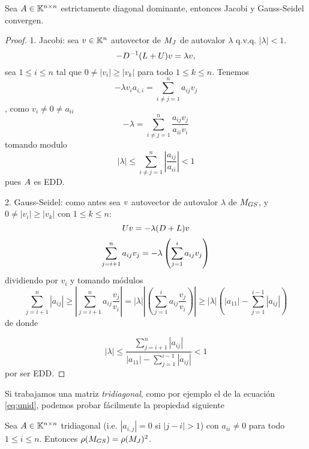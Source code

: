 \tcc
\begin{prop}
Sea $\Ab\in \Knn$ estrictamente diagonal dominante, entonces Jacobi y Gauss-Seidel convergen.
\end{prop}
\etcc
\begin{proof}
1. Jacobi: sea $\vb\in \Kn$ autovector de $\Mb_J$ de autovalor $\lambda$ q.v.q. $|\lambda|<1$.
$$
-D^{-1}(L+U)\vb=\lambda\vb,
$$
sea $1\le i\le n$ tal que
$0\neq |v_i|\ge |v_k|$ para todo $1\le k\le n$. Tenemos
$$
-\lambda v_ia_{i,i}=\sum_{i\neq j=1}^n a_{ij}v_j
$$, como $v_i\neq 0\neq a_{ii}$
$$
-\lambda=\sum_{i\neq j=1}^n \frac{a_{ij}v_j}{a_{ii}v_i}
$$
tomando modulo
$$
|\lambda|\le \sum_{i\neq j=1}^n |\frac{a_{ij}}{a_{ii}}|<1
$$
pues $\Ab$ es EDD.

2. Gauss-Seidel: como antes sea $\vb$ autovector de autovalor $\lambda$ de $\Mb_{GS}$, y $0\neq|v_i|\ge |v_k|$ con $1\le k\le n$:
$$
\Ub\vb=-\lambda(\Db+\Lb)\vb
$$
$$
\sum_{j=i+1}^na_{ij}\vb_j=-\lambda\left(
\sum_{j=1}^{i}a_{ij}\vb_j\right)
$$
dividiendo por $v_i$ y tomando módulos
$$
\sum_{j=i+1}^n|a_{ij}|
\ge \left|\sum_{j=i+1}^na_{ij}\frac{v_j}{v_i}\right|=|\lambda|\left|\left(
\sum_{j=1}^{i}a_{ij}\frac{v_j}{v_i}\right)\right|\ge |\lambda| \left(|a_{11}|-
\sum_{j=1}^{i-1}|a_{ij}|\right)
$$
de donde

$$
|\lambda|\le
\frac{\sum_{j=i+1}^n|a_{ij}|}{|a_{11}|-
\sum_{j=1}^{i-1}|a_{ij}|}
<1
$$
por ser EDD.
\end{proof}
Si trabajamos una matriz \emph{tridiagonal}, como por ejemplo el de la ecuación \eqref{eq:unid},  podemos probar fácilmente la propiedad siguiente
 \begin{prop}
\label{prop:mat_trid_gs_j}
Sea $\Ab\in \Knn$ tridiagonal (i.e. $|a_{i,j}|=0$ si $|j-i|>1$) con $a_{ii}\neq 0$ para todo $1\le i\le n$.  Entonces
$\rho(\Mb_{GS})=\rho(\Mb_{J})^2$. 
\end{prop}
